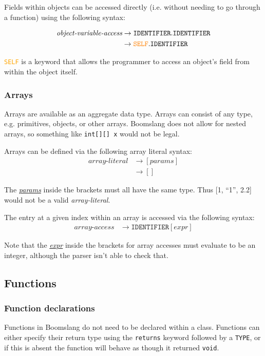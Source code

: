 \documentclass{article}
\begin{document}
Fields within objects can be accessed directly (i.e. without needing to go through a function) using the following syntax:

\label{sec:object-variable-access}
\begin{align*}
    \textit{object-variable-access} &\to \texttt{IDENTIFIER}.\texttt{IDENTIFIER} \\
    &\to \textcolor{orange}{\texttt{SELF}}.\texttt{IDENTIFIER}
\end{align*}

\textcolor{orange}{\texttt{SELF}} is a keyword that allows the programmer to access an object's field from within the object itself.

\subsubsection{Arrays}
Arrays are available as an aggregate data type. Arrays can consist of any type, e.g. primitives, objects, or other arrays. Boomslang does not allow for nested arrays, so something like \texttt{int[][] x} would not be legal.

Arrays can be defined via the following array literal syntax:
\label{sec:array-literal}
\begin{align*}
    \textit{array-literal} &\to [\hyperref[sec:params]{\textit{params}}] \\
    &\to []
\end{align*}

The \hyperref[sec:params]{\textit{params}} inside the brackets must all have the same type. Thus [1, ``1'', 2.2] would not be a valid \textit{array-literal}.

The entry at a given index within an array is accessed via the following syntax:
\label{sec:array-access}
\begin{align*}
    \textit{array-access} &\to \texttt{IDENTIFIER}[\hyperref[sec:expr]{\textit{expr}}]
\end{align*}

Note that the \hyperref[sec:expr]{\textit{expr}} inside the brackets for array accesses must evaluate to be an integer, although the parser isn't able to check that.

\subsection{Functions}
\subsubsection{Function declarations}
Functions in Boomslang do not need to be declared within a class. Functions can either specify their return type using the \texttt{returns} keyword followed by a \texttt{TYPE}, or if this is absent the function will behave as though it returned \texttt{void}.
\end{document}
